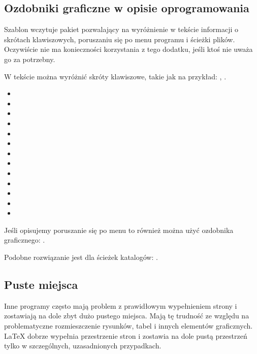 \subsection{Ozdobniki graficzne w opisie oprogramowania}
Szablon wczytuje pakiet pozwalający na wyróżnienie w tekście informacji o skrótach klawiszowych, poruszaniu się po menu programu i ścieżki plików. Oczywiście nie ma konieczności korzystania z tego dodatku, jeśli ktoś nie uważa go za potrzebny.

W tekście można wyróżnić skróty klawiszowe, takie jak na przykład: , \keys{\ctrl, \Alt, \del}.
\begin{itemize}
    \item {}
    \item \keys{\Space} \keys{\SPACE}
    \item \keys{\backspace} \keys{\del} \keys{\backdel}
    \item \keys{\return} \keys{\enter}
    \item \keys{\shift} \keys{\capslock}
    \item \keys{\ctrl} \keys{\Alt} \keys{\AltGr}
    \item \keys{\tab}
    \item \keys{\esc} \keys{\oldesc}
    \item \keys{\winmenu}
    \item \keys{\arrowkey{^}} \keys{\arrowkeyup}
    \item {} \keys{\arrowkeydown}
    \item \keys{\arrowkey{>}} \keys{\arrowkeyright}
    \item \keys{\arrowkey{<}} \keys{\arrowkeyleft}
\end{itemize}

Jeśli opisujemy poruszanie się po menu to również można użyć ozdobnika graficznego: .

Podobne rozwiązanie jest dla ścieżek katalogów: .

\subsection{Puste miejsca}
Inne programy często mają problem z prawidłowym wypełnieniem strony i zostawiają na dole zbyt dużo pustego miejsca. Mają tę trudność ze względu na problematyczne rozmieszczenie rysunków, tabel i innych elementów graficznych. \LaTeX{} dobrze wypełnia przestrzenie stron i zostawia na dole pustą przestrzeń tylko w szczególnych, uzasadnionych przypadkach.

